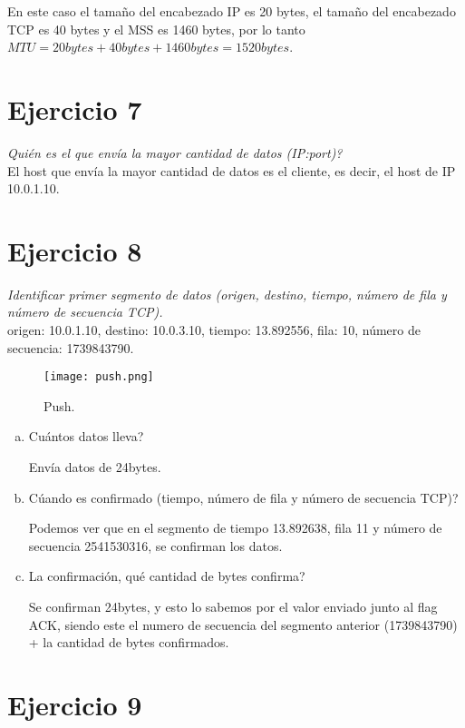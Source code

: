 \documentclass[osajnl,twocolumn,showpacs,superscriptaddress,10pt]{revtex4-1} %
\begin{document}
En este caso el tamaño del encabezado IP es 20 bytes, el tamaño del encabezado TCP es 40 bytes y el MSS es 1460 bytes, 
por lo tanto $MTU = 20 bytes + 40 bytes + 1460 bytes = 1520 bytes$.

\section{Ejercicio 7}

\textit{Quién es el que envía la mayor cantidad de datos (IP:port)?} \\

El host que envía la mayor cantidad de datos es el cliente, es decir, el host de IP 10.0.1.10.

\section{Ejercicio 8}

\textit{Identificar primer segmento de datos (origen, destino, tiempo, número de fila y número de secuencia TCP).} \\

origen: 10.0.1.10, destino: 10.0.3.10, tiempo: 13.892556, fila: 10, número de secuencia: 1739843790.

\begin{figure}[H]
    \centering
    \texttt{[image: push.png]}
    \caption{Push.}
    \label{push}
\end{figure}

\begin{enumerate}[a)]
    \item Cuántos datos lleva?

    Envía datos de 24bytes.

    \item Cúando es confirmado (tiempo, número de fila y número de secuencia TCP)?

    Podemos ver que en el segmento de tiempo 13.892638, fila 11 y número de secuencia 2541530316,
    se confirman los datos.

    \item La confirmación, qué cantidad de bytes confirma?

    Se confirman 24bytes, y esto lo sabemos por el valor enviado junto al flag ACK, siendo este el numero de secuencia
    del segmento anterior (1739843790) + la cantidad de bytes confirmados.
\end{enumerate}

\section{Ejercicio 9}
\end{document}
